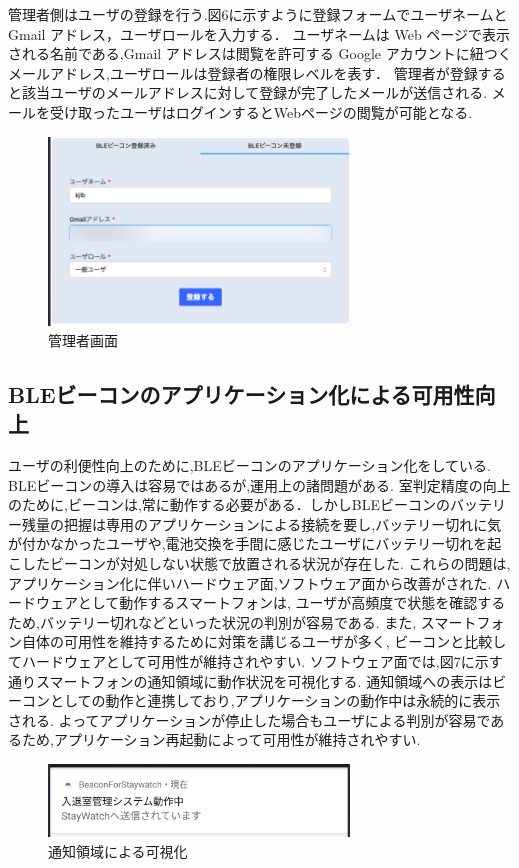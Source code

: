 \documentclass[a4j,8pt,twocolumn]{extarticle}
\begin{document}
管理者側はユーザの登録を行う.図6に示すように登録フォームでユーザネームと Gmail アドレス，ユーザロールを入力する．
ユーザネームは Web ページで表示される名前である,Gmail アドレスは閲覧を許可する Google アカウントに紐つくメールアドレス,ユーザロールは登録者の権限レベルを表す．
管理者が登録すると該当ユーザのメールアドレスに対して登録が完了したメールが送信される.
メールを受け取ったユーザはログインするとWebページの閲覧が可能となる.
\begin{figure}[tbh]
    \centering
    \includegraphics[width=8cm]{admin.jpg}
    \caption{管理者画面}
    \label{multipleBPM}
\end{figure}


\subsection{BLEビーコンのアプリケーション化による可用性向上}
ユーザの利便性向上のために,BLEビーコンのアプリケーション化をしている. BLEビーコンの導入は容易ではあるが,運用上の諸問題がある.
室判定精度の向上のために,ビーコンは,常に動作する必要がある．しかしBLEビーコンのバッテリー残量の把握は専用のアプリケーションによる接続を要し,バッテリー切れに気が付かなかったユーザや,電池交換を手間に感じたユーザにバッテリー切れを起こしたビーコンが対処しない状態で放置される状況が存在した. これらの問題は,アプリケーション化に伴いハードウェア面,ソフトウェア面から改善がされた.
ハードウェアとして動作するスマートフォンは, ユーザが高頻度で状態を確認するため,バッテリー切れなどといった状況の判別が容易である. また, スマートフォン自体の可用性を維持するために対策を講じるユーザが多く,
ビーコンと比較してハードウェアとして可用性が維持されやすい.
ソフトウェア面では,図7に示す通りスマートフォンの通知領域に動作状況を可視化する. 通知領域への表示はビーコンとしての動作と連携しており,アプリケーションの動作中は永続的に表示される. よってアプリケーションが停止した場合もユーザによる判別が容易であるため,アプリケーション再起動によって可用性が維持されやすい.

\begin{figure}[tbh]
    \centering
    \includegraphics[width=8cm]{trans.jpg}
    \caption{通知領域による可視化}
    \label{multipleBPM}
\end{figure}
\end{document}

